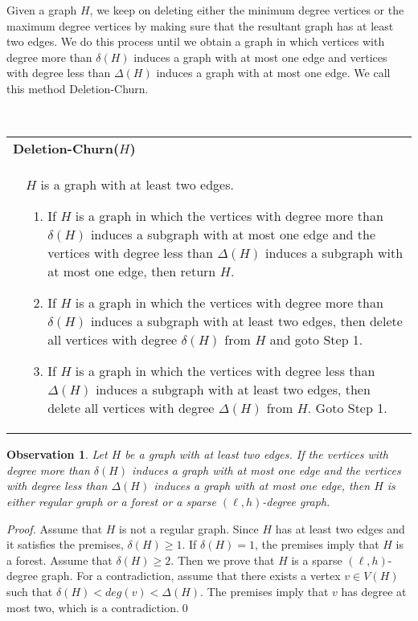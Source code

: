 \documentclass[envcountsame,envcountsect,10pt,oribibl]{llncs}
\newtheorem{observation}[lemma]{Observation}
\newcommand{\defstage}[2]{\hfill\\\smallskip\noindent \begin{tabularx}{\textwidth}{|l X|}\hline \multicolumn{2}{|l|}{\textbf{#1}}\\&#2\\\hline \end{tabularx}}
\begin{document}
Given a graph $H$, we keep on deleting either the minimum degree vertices or the 
maximum degree vertices by making sure that the resultant graph has at least 
two edges. We do this process until we obtain a graph
in which vertices with degree more than $\delta(H)$ induces a graph with 
at most one edge and vertices with degree less than $\Delta(H)$ induces
a graph with at most one edge. We call this method Deletion-Churn.

\defstage{Deletion-Churn($H$)}
{ $H$ is a graph with at least two edges.
  \begin{enumerate}[Step 1:]
    \item\label{item:churn-del1} If $H$ is a graph in which the vertices with degree more than $\delta(H)$
      induces a subgraph with at most one edge and the vertices with degree less than $\Delta(H)$ induces
      a subgraph with at most one edge, then return $H$.
    \item\label{item:churn-del2} If $H$ is a graph in which the vertices with degree more than $\delta(H)$
      induces a subgraph with at least two edges, then delete all vertices with degree $\delta(H)$ from $H$ and goto Step 1.
    \item\label{item:churn-compl3} If $H$ is a graph in which the vertices with degree less than $\Delta(H)$
      induces a subgraph with at least two edges, then delete all vertices with degree $\Delta(H)$ from $H$. Goto Step 1.
  \end{enumerate}
}

\begin{observation}
  \label{obs:deletion-churn}
  Let $H$ be a graph with at least two edges. If the vertices with degree more than $\delta(H)$ 
  induces a graph with at most one edge and the vertices with degree less than $\Delta(H)$ induces
  a graph with at most one edge, then $H$ is either regular graph or a forest or a sparse $(\ell,h)$-degree graph.
\end{observation}
\begin{proof}
  Assume that $H$ is not a regular graph.
  Since $H$ has at least two edges and it satisfies the premises, $\delta(H)\geq 1$.
  If $\delta(H)=1$, the premises imply that $H$ is a forest. Assume that $\delta(H)\geq 2$.
  Then we prove that $H$ is a sparse $(\ell,h)$-degree graph.
  For a contradiction, assume that there exists a vertex $v\in V(H)$ such that $\delta(H)<deg(v)<\Delta(H)$.
  The premises imply that $v$ has degree at most two, which is a contradiction.\qed
\end{proof}
\end{document}

